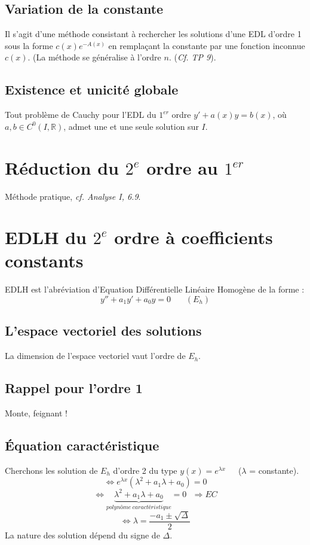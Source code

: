 \documentclass[11pt, a4paper, openany]{book}
\begin{document}
\subsection{Variation de la constante}
Il s'agit d'une méthode consistant à rechercher les solutions d'une EDL d'ordre 1 sous la forme $c(x)e^{-A(x)}$ en remplaçant la constante par une fonction inconnue $c(x)$. (La méthode se généralise à l'ordre $n$. (\textit{Cf. TP 9}).

\subsection{Existence et unicité globale}
Tout problème de Cauchy pour l'EDL du $1^{er}$ ordre $y'+a(x)y = b(x)$, où $a, b \in C^0(I, \mathbb{R})$, admet une et une seule solution sur $I$.

\section{Réduction du $2^e$ ordre au $1^{er}$}
Méthode pratique, \textit{cf. Analyse I, 6.9}.

\section{EDLH du $2^e$ ordre à coefficients constants}
EDLH est l'abréviation d'Equation Différentielle Linéaire Homogène de la forme :
$$y'' + a_1y' + a_0y = 0\ \ \ \ \ \ \ \ (E_h)$$
\subsection{L'espace vectoriel des solutions}
La dimension de l'espace vectoriel vaut l'ordre de $E_h$.

\subsection{Rappel pour l'ordre 1}
Monte, feignant !

\subsection{Équation caractéristique}
Cherchons les solution de $E_h$ d'ordre 2 du type $y(x) = e^{\lambda x}$\ \ \ ($\lambda$ = constante).\\
$$\Leftrightarrow e^{\lambda x}(\lambda^2 + a_1\lambda + a_0) = 0$$
$$\Leftrightarrow \underbrace{\lambda^2 + a_1\lambda + a_0}_{polynôme\ caractéristique} = 0\ \ \ \Rightarrow EC$$
$$\Leftrightarrow \lambda = \frac{-a_1 \pm \sqrt{\Delta}}{2}$$
La nature des solution dépend du signe de $\Delta$.
\end{document}
